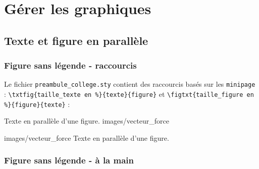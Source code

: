 \chapter{Gérer les graphiques}
\label{ch:graphiques}





\section{Texte et figure en parallèle}



\subsection{Figure sans légende - raccourcis}

Le fichier \lstinline!preambule_college.sty! contient des raccourcis basés sur les \lstinline!minipage! : \newline
\lstinline!\txtfig{taille_texte en %}{texte}{figure}! et \lstinline!\figtxt{taille_figure en %}{figure}{texte}! :




\begin{LTXexample}[pos=o]
  {Texte en parallèle d'une figure.}
  {images/vecteur_force}
\end{LTXexample}

\begin{LTXexample}[pos=o]
  {images/vecteur_force}
  {Texte en parallèle d'une figure.}
\end{LTXexample}


\subsection{Figure sans légende - à la main}

